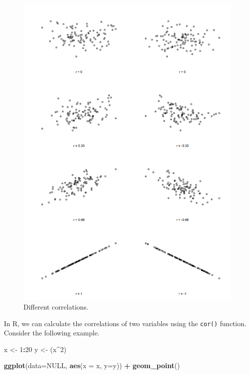 \documentclass[
]{book}
\newenvironment{Shaded}{\begin{snugshade}}{\end{snugshade}}
\newcommand{\AttributeTok}[1]{\textcolor[rgb]{0.13,0.29,0.53}{#1}}
\newcommand{\ConstantTok}[1]{\textcolor[rgb]{0.56,0.35,0.01}{#1}}
\newcommand{\DecValTok}[1]{\textcolor[rgb]{0.00,0.00,0.81}{#1}}
\newcommand{\FunctionTok}[1]{\textcolor[rgb]{0.13,0.29,0.53}{\textbf{#1}}}
\newcommand{\NormalTok}[1]{#1}
\newcommand{\OtherTok}[1]{\textcolor[rgb]{0.56,0.35,0.01}{#1}}
\newcommand{\SpecialCharTok}[1]{\textcolor[rgb]{0.81,0.36,0.00}{\textbf{#1}}}
\begin{document}
\begin{figure}
\centering
\includegraphics{./img/corr-1.png}
\caption{\label{fig:correlations}Different correlations.}
\end{figure}

In R, we can calculate the correlations of two variables using the \texttt{cor()} function. Consider the following example.

\begin{Shaded}
\begin{Highlighting}[]
\NormalTok{x }\OtherTok{\textless{}{-}} \DecValTok{1}\SpecialCharTok{:}\DecValTok{20}
\NormalTok{y }\OtherTok{\textless{}{-}}\NormalTok{ (x}\SpecialCharTok{\^{}}\DecValTok{2}\NormalTok{)}

\FunctionTok{ggplot}\NormalTok{(}\AttributeTok{data=}\ConstantTok{NULL}\NormalTok{, }\FunctionTok{aes}\NormalTok{(}\AttributeTok{x =}\NormalTok{ x, }\AttributeTok{y=}\NormalTok{y)) }\SpecialCharTok{+}
  \FunctionTok{geom\_point}\NormalTok{()}
\end{Highlighting}
\end{Shaded}
\end{document}
